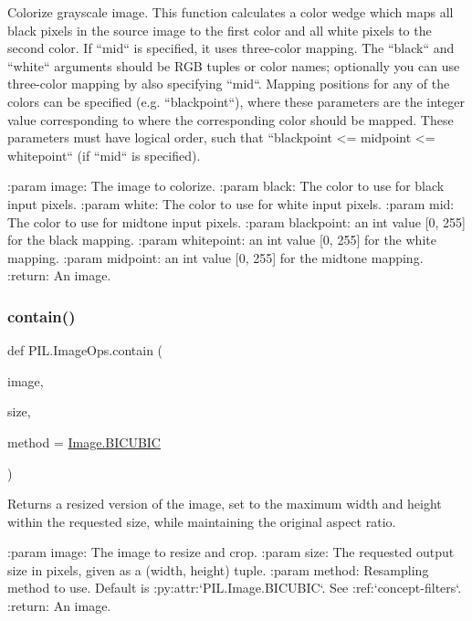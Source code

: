 \begin{DoxyVerb}Colorize grayscale image.
This function calculates a color wedge which maps all black pixels in
the source image to the first color and all white pixels to the
second color. If ``mid`` is specified, it uses three-color mapping.
The ``black`` and ``white`` arguments should be RGB tuples or color names;
optionally you can use three-color mapping by also specifying ``mid``.
Mapping positions for any of the colors can be specified
(e.g. ``blackpoint``), where these parameters are the integer
value corresponding to where the corresponding color should be mapped.
These parameters must have logical order, such that
``blackpoint <= midpoint <= whitepoint`` (if ``mid`` is specified).

:param image: The image to colorize.
:param black: The color to use for black input pixels.
:param white: The color to use for white input pixels.
:param mid: The color to use for midtone input pixels.
:param blackpoint: an int value [0, 255] for the black mapping.
:param whitepoint: an int value [0, 255] for the white mapping.
:param midpoint: an int value [0, 255] for the midtone mapping.
:return: An image.
\end{DoxyVerb}
 \mbox{\label{namespacePIL_1_1ImageOps_a936e452e4388ae6b0cf19ff6881d562e}} 
\subsubsection{\texorpdfstring{contain()}{contain()}}
{\footnotesize\ttfamily def P\+I\+L.\+Image\+Ops.\+contain (\begin{DoxyParamCaption}\item[{}]{image,  }\item[{}]{size,  }\item[{}]{method = {\ttfamily \hyperlink{namespacePIL_1_1Image_a3824ac5a0532aa60f7072af889d88e59}{Image.\+B\+I\+C\+U\+B\+IC}} }\end{DoxyParamCaption})}

\begin{DoxyVerb}Returns a resized version of the image, set to the maximum width and height
within the requested size, while maintaining the original aspect ratio.

:param image: The image to resize and crop.
:param size: The requested output size in pixels, given as a
             (width, height) tuple.
:param method: Resampling method to use. Default is
               :py:attr:`PIL.Image.BICUBIC`. See :ref:`concept-filters`.
:return: An image.
\end{DoxyVerb}
 \mbox{\label{namespacePIL_1_1ImageOps_a97f0cbbea442db0681e45c7b64395a6d}} 
